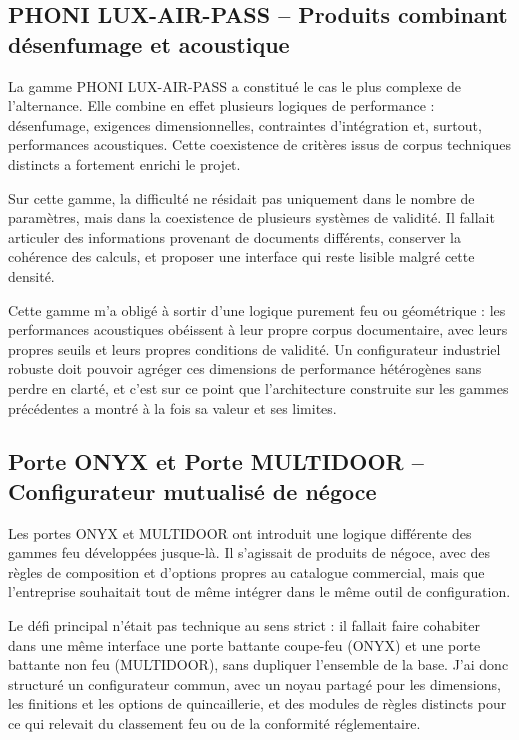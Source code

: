 \subsection{PHONI LUX-AIR-PASS -- Produits combinant désenfumage et acoustique}

La gamme PHONI LUX-AIR-PASS a constitué le cas le plus complexe de l'alternance. Elle combine en effet plusieurs logiques de performance : désenfumage, exigences dimensionnelles, contraintes d'intégration et, surtout, performances acoustiques. Cette coexistence de critères issus de corpus techniques distincts a fortement enrichi le projet.

Sur cette gamme, la difficulté ne résidait pas uniquement dans le nombre de paramètres, mais dans la coexistence de plusieurs systèmes de validité. Il fallait articuler des informations provenant de documents différents, conserver la cohérence des calculs, et proposer une interface qui reste lisible malgré cette densité.

Cette gamme m'a obligé à sortir d'une logique purement feu ou géométrique : les performances acoustiques obéissent à leur propre corpus documentaire, avec leurs propres seuils et leurs propres conditions de validité. Un configurateur industriel robuste doit pouvoir agréger ces dimensions de performance hétérogènes sans perdre en clarté, et c'est sur ce point que l'architecture construite sur les gammes précédentes a montré à la fois sa valeur et ses limites.

\subsection{Porte ONYX et Porte MULTIDOOR -- Configurateur mutualisé de négoce}

Les portes ONYX et MULTIDOOR ont introduit une logique différente des gammes feu développées jusque-là. Il s'agissait de produits de négoce, avec des règles de composition et d'options propres au catalogue commercial, mais que l'entreprise souhaitait tout de même intégrer dans le même outil de configuration.

Le défi principal n'était pas technique au sens strict : il fallait faire cohabiter dans une même interface une porte battante coupe-feu (ONYX) et une porte battante non feu (MULTIDOOR), sans dupliquer l'ensemble de la base. J'ai donc structuré un configurateur commun, avec un noyau partagé pour les dimensions, les finitions et les options de quincaillerie, et des modules de règles distincts pour ce qui relevait du classement feu ou de la conformité réglementaire.

